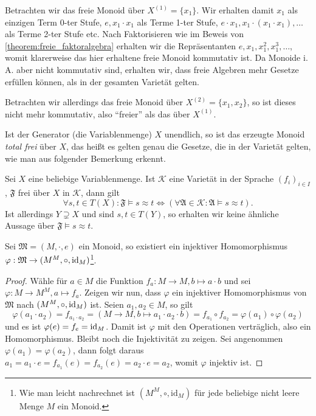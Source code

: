 \begin{remark}
    Betrachten wir das freie Monoid über $X^{(1)} = \{x_1\}$. Wir erhalten damit $x_1$ als einzigen Term 0-ter Stufe, $e, x_1 \cdot x_1$ als Terme 1-ter Stufe, $e \cdot x_1, x_1\cdot(x_1 \cdot x_1), \ldots$ als Terme 2-ter Stufe etc. Nach Faktorisieren wie im Beweis von \cref{theorem:freie_faktoralgebra} erhalten wir die Repräsentanten $e, x_1, x_1^2, x_1^3, \ldots$, womit klarerweise das hier erhaltene freie Monoid kommutativ ist. Da Monoide i. A. aber nicht kommutativ sind, erhalten wir, dass freie Algebren mehr Gesetze erfüllen können, als in der gesamten Varietät gelten. 
    
    Betrachten wir allerdings das freie Monoid über $X^{(2)} = \{x_1, x_2\}$, so ist dieses nicht mehr kommutativ, also ``freier'' als das über $X^{(1)}$. 

    Ist der Generator (die Variablenmenge) $X$ unendlich, so ist das erzeugte Monoid \emph{total frei} über $X$, das heißt es gelten genau die Gesetze, die in der Varietät gelten, wie man aus folgender Bemerkung erkennt.
\end{remark}

\begin{remark}
   Sei $X$ eine beliebige Variablenmenge. Ist $\mathcal{K}$ eine Varietät in der Sprache $(f_i)_{i\in I}$, $\mathfrak{F}$ frei über $X$ in $\mathcal{K}$, dann gilt $$\forall s,t \in T(X): \mathfrak{F} \models s\approx t \Leftrightarrow \left(\forall \mathfrak{A} \in \mathcal{K}: \mathfrak{A} \models s \approx t\right).$$ 
    Ist allerdings $Y \supsetneq X$ und sind $s,t \in T(Y)$, so erhalten wir keine ähnliche Aussage über $\mathfrak{F} \models s \approx t$.
\end{remark}

\begin{theorem}\label{theorem:darstellungssatz-cayley-monoid}
    Sei $\mathfrak{M} = (M, \cdot, e)$ ein Monoid, so existiert ein injektiver Homomorphismus $\varphi: \mathfrak{M} \to (M^M, \circ, \operatorname{id}_M)$\footnote{Wie man leicht nachrechnet ist $(M^M,\circ,\mathrm{id}_M)$ für jede beliebige nicht leere Menge $M$ ein Monoid.}.
\end{theorem}
\begin{proof}
    Wähle für $a \in M$ die Funktion $f_a: M \to M, b \mapsto a \cdot b$ und sei $\varphi: M \to M^M, a \mapsto f_a$. Zeigen wir nun, dass $\varphi$ ein injektiver Homomorphismus von $\mathfrak{M}$ nach $(M^M, \circ, \operatorname{id}_M)$ ist. Seien $a_1, a_2 \in M$, so gilt $$\varphi(a_1 \cdot a_2) = f_{a_1 \cdot a_2} = (M \to M, b \mapsto a_1 \cdot a_2 \cdot b) = f_{a_1} \circ f_{a_2} = \varphi(a_1) \circ \varphi(a_2)$$
    und es ist $\varphi(e) = f_e = \operatorname{id}_M$. Damit ist $\varphi$ mit den Operationen verträglich, also ein Homomorphismus. Bleibt noch die Injektivität zu zeigen. Sei angenommen $\varphi(a_1) = \varphi(a_2)$, dann folgt daraus $a_1 = a_1 \cdot e = f_{a_1}(e) = f_{a_2}(e) = a_2 \cdot e = a_2$, womit $\varphi$ injektiv ist.
\end{proof}

